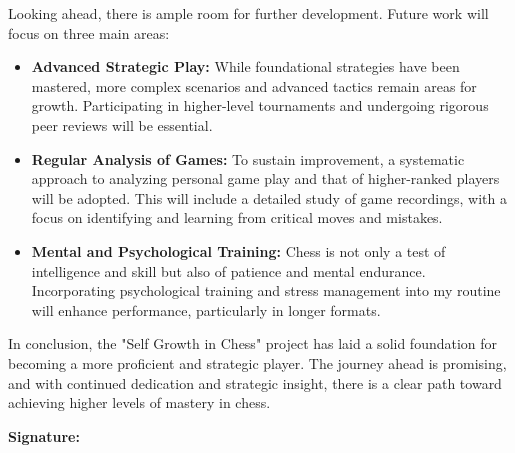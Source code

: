 \documentclass[a4paper,11pt]{article}
\begin{document}
Looking ahead, there is ample room for further development. Future work will focus on three main areas:
\begin{itemize}
    \item \textbf{Advanced Strategic Play:} While foundational strategies have been mastered, more complex scenarios and advanced tactics remain areas for growth. Participating in higher-level tournaments and undergoing rigorous peer reviews will be essential.
    \item \textbf{Regular Analysis of Games:} To sustain improvement, a systematic approach to analyzing personal game play and that of higher-ranked players will be adopted. This will include a detailed study of game recordings, with a focus on identifying and learning from critical moves and mistakes.
    \item \textbf{Mental and Psychological Training:} Chess is not only a test of intelligence and skill but also of patience and mental endurance. Incorporating psychological training and stress management into my routine will enhance performance, particularly in longer formats.
\end{itemize}

In conclusion, the "Self Growth in Chess" project has laid a solid foundation for becoming a more proficient and strategic player. The journey ahead is promising, and with continued dedication and strategic insight, there is a clear path toward achieving higher levels of mastery in chess.
\vfill %
\begin{flushright}
    \textbf{Signature:}\\
\end{flushright}
\end{document}
